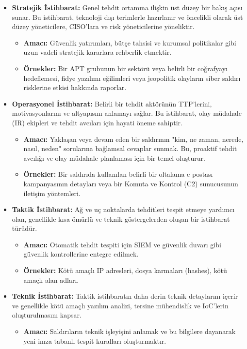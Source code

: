 \begin{itemize}
    \item \textbf{Stratejik İstihbarat:} Genel tehdit ortamına ilişkin üst düzey bir bakış açısı sunar. Bu istihbarat, teknoloji dışı terimlerle hazırlanır ve öncelikli olarak üst düzey yöneticilere, CISO'lara ve risk yöneticilerine yöneliktir.
    \begin{itemize}
        \item \textbf{Amacı:} Güvenlik yatırımları, bütçe tahsisi ve kurumsal politikalar gibi uzun vadeli stratejik kararlara rehberlik etmektir.
        \item \textbf{Örnekler:} Bir APT grubunun bir sektörü veya belirli bir coğrafyayı hedeflemesi, fidye yazılımı eğilimleri veya jeopolitik olayların siber saldırı risklerine etkisi hakkında raporlar.
    \end{itemize}
    \item \textbf{Operasyonel İstihbarat:} Belirli bir tehdit aktörünün TTP'lerini, motivasyonlarını ve altyapısını anlamayı sağlar. Bu istihbarat, olay müdahale (IR) ekipleri ve tehdit avcıları için hayati öneme sahiptir.
    \begin{itemize}
        \item \textbf{Amacı:} Yaklaşan veya devam eden bir saldırının "kim, ne zaman, nerede, nasıl, neden" sorularına bağlamsal cevaplar sunmak. Bu, proaktif tehdit avcılığı ve olay müdahale planlaması için bir temel oluşturur.
        \item \textbf{Örnekler:} Bir saldırıda kullanılan belirli bir oltalama e-postası kampanyasının detayları veya bir Komuta ve Kontrol (C2) sunucusunun iletişim yöntemleri.
    \end{itemize}
    \item \textbf{Taktik İstihbarat:} Ağ ve uç noktalarda tehditleri tespit etmeye yardımcı olan, genellikle kısa ömürlü ve teknik göstergelerden oluşan bir istihbarat türüdür.
    \begin{itemize}
        \item \textbf{Amacı:} Otomatik tehdit tespiti için SIEM ve güvenlik duvarı gibi güvenlik kontrollerine entegre edilmek.
        \item \textbf{Örnekler:} Kötü amaçlı IP adresleri, dosya karmaları (hashes), kötü amaçlı alan adları.
    \end{itemize}
    \item \textbf{Teknik İstihbarat:} Taktik istihbaratın daha derin teknik detaylarını içerir ve genellikle kötü amaçlı yazılım analizi, tersine mühendislik ve IoC'lerin oluşturulmasını kapsar.
    \begin{itemize}
        \item \textbf{Amacı:} Saldırıların teknik işleyişini anlamak ve bu bilgilere dayanarak yeni imza tabanlı tespit kuralları oluşturmaktır.
    \end{itemize}
\end{itemize}

